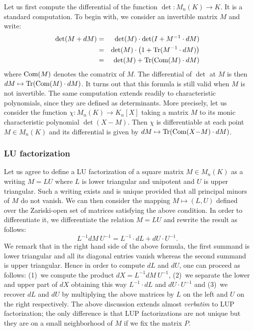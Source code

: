 \documentclass{lms}
\begin{document}
Let us first compute the differential of the function $\det : M_n(K) \to 
K$. It is a standard computation. To begin with, we consider an 
invertible matrix $M$ and write:
\begin{eqnarray*}
\det(M + dM) &=& \det(M) \cdot \det(I + M^{-1} \cdot dM)  \\
&=& \det(M) \cdot \big(1 + \text{\rm Tr}(M^{-1} \cdot dM)\big) \\
&=& \det(M) + \text{\rm Tr}(\text{\rm Com}(M) \cdot dM)
\end{eqnarray*}
where $\text{\rm Com}(M)$ denotes the comatrix of $M$. The differential of 
$\det$ at $M$ is then $dM \mapsto \text{\rm Tr}(\text{\rm Com}(M) \cdot dM)$. It turns
out that this formula is still valid when $M$ is not invertible.
The same computation extends readily to characteristic polynomials,
since they are defined as determinants. More precisely, let us 
consider the function $\chi : M_n(K) \to K_n[X]$ taking a matrix 
$M$ to its monic characteristic polynomial $\det(X-M)$.
Then $\chi$ is differentiable at each point $M \in M_n(K)$ and its 
differential is given by $dM \mapsto \text{\rm Tr}(\text{\rm Com}(X{-}M) \cdot dM)$.

\subsubsection*{LU factorization}

Let us agree to define a 
LU factorization of a square matrix $M \in M_n(K)$ as a writing $M = LU$ 
where $L$ is lower triangular and unipotent and $U$ is upper triangular. 
Such a writing exists and is unique provided that all principal minors 
of $M$ do not vanish. We can then consider the mapping $M \mapsto (L,U)$ 
defined over the Zariski-open set of matrices satisfying the above 
condition. In order to differentiate it, we differentiate the relation 
$M = LU$ and rewrite the result as follows:
$$L^{-1} dM \: U^{-1} = L^{-1} \cdot dL + dU \cdot U^{-1}.$$
We remark that in the right hand side of the above formula, the first
summand is lower triangular and all its diagonal entries vanish whereas 
the second summand is upper triangular. Hence in order to compute $dL$
and $dU$, one can proceed as follows: (1)~we compute the product $dX = 
L^{-1} dM \: U^{-1}$, (2)~we separate the lower and upper part of $dX$
obtaining this way $L^{-1} \cdot dL$ and $dU \cdot U^{-1}$ and (3)~we
recover $dL$ and $dU$ by multiplying the above matrices by $L$ on the 
left and $U$ on the right respectively. 
The above discussion extends almost \emph{verbatim} to LUP 
factorization; the only difference is that LUP factorizations are not 
unique but they are on a small neighborhood of $M$ if we fix the matrix 
$P$.
\end{document}
